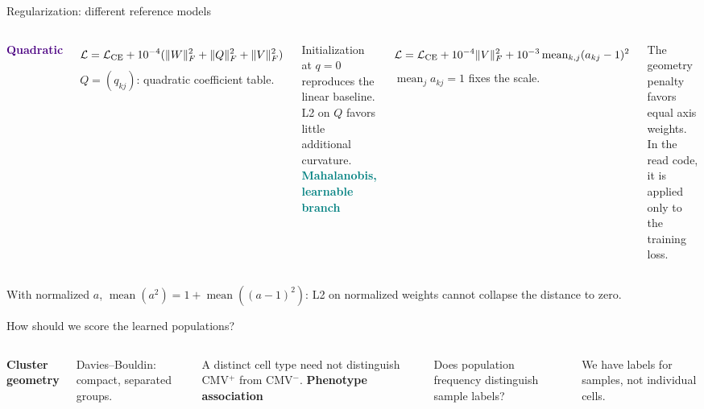 \begin{frame}{Regularization: different reference models}

\begin{columns}[T,onlytextwidth]
\textcolor{Indigo}{\textbf{Quadratic}}\par
\[\mathcal L=\mathcal L_{\rm CE}+10^{-4}(\|W\|_F^2+\|Q\|_F^2+\|V\|_F^2)\]
\small $Q=(q_{kj})$: quadratic coefficient table.\par
\vspace{2mm}
Initialization at $q=0$ reproduces the linear baseline. L2 on $Q$ favors little additional curvature.
\textcolor{Teal}{\textbf{Mahalanobis, learnable branch}}\par
\[\mathcal L=\mathcal L_{\rm CE}+10^{-4}\|V\|_F^2
+10^{-3}\operatorname{mean}_{k,j}(a_{kj}-1)^2\]
\small $\operatorname{mean}_j a_{kj}=1$ fixes the scale.\par
\vspace{2mm}
The geometry penalty favors equal axis weights. In the read code, it is applied only to the training loss.
\end{columns}
\vspace{3mm}
\small With normalized $a$, $\operatorname{mean}(a^2)=1+\operatorname{mean}((a-1)^2)$: L2 on normalized weights cannot collapse the distance to zero.

\end{frame}

\begin{frame}{How should we score the learned populations?}

\begin{columns}[T,onlytextwidth]
\textbf{Cluster geometry}\par
\vspace{2mm}
Davies--Bouldin: compact, separated groups.\par
\vspace{3mm}
A distinct cell type need not distinguish CMV$^+$ from CMV$^-$. 
\textbf{Phenotype association}\par
\vspace{2mm}
Does population frequency distinguish sample labels?\par
\vspace{3mm}
We have labels for samples, not individual cells.
\end{columns}
\vspace{4mm}

\end{frame}

